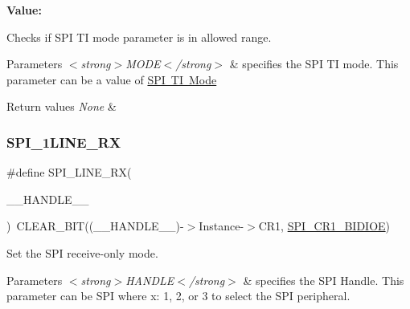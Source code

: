 {\bfseries Value\+:}
\begin{DoxyCode}{0}

\end{DoxyCode}


Checks if S\+PI TI mode parameter is in allowed range. 


\begin{DoxyParams}{Parameters}
{\em $<$strong$>$\+M\+O\+D\+E$<$/strong$>$} & specifies the S\+PI TI mode. This parameter can be a value of \mbox{\hyperlink{group___s_p_i___t_i__mode}{S\+PI TI Mode}} \\
\hline
\end{DoxyParams}

\begin{DoxyRetVals}{Return values}
{\em None} & \\
\hline
\end{DoxyRetVals}
\mbox{\label{group___s_p_i___private___macros_gaa8d58cef91c1874d5a4dde4014cf6269}} 
\subsubsection{\texorpdfstring{SPI\_1LINE\_RX}{SPI\_1LINE\_RX}}
{\footnotesize\ttfamily \#define S\+P\+I\+\_\+L\+I\+N\+E\+\_\+\+RX(\begin{DoxyParamCaption}\item[{}]{\+\_\+\+\_\+\+H\+A\+N\+D\+L\+E\+\_\+\+\_\+ }\end{DoxyParamCaption})~C\+L\+E\+A\+R\+\_\+\+B\+IT((\+\_\+\+\_\+\+H\+A\+N\+D\+L\+E\+\_\+\+\_\+)-\/$>$Instance-\/$>$C\+R1, \mbox{\hyperlink{group___peripheral___registers___bits___definition_ga378953916b7701bd49f063c0366b703f}{S\+P\+I\+\_\+\+C\+R1\+\_\+\+B\+I\+D\+I\+OE}})}



Set the S\+PI receive-\/only mode. 


\begin{DoxyParams}{Parameters}
{\em $<$strong$>$\+H\+A\+N\+D\+L\+E$<$/strong$>$} & specifies the S\+PI Handle. This parameter can be S\+PI where x\+: 1, 2, or 3 to select the S\+PI peripheral. \\
\hline
\end{DoxyParams}

